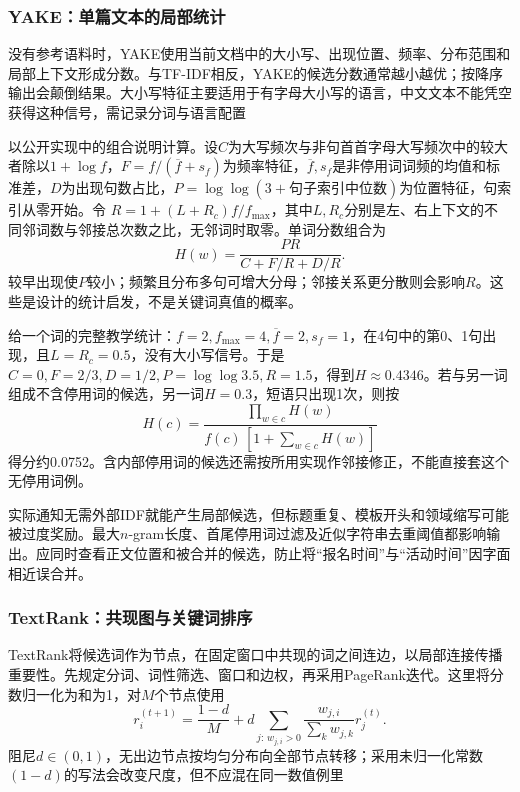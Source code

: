 \subsubsection{YAKE：单篇文本的局部统计}
\label{sec:nlp-classification-yake}

没有参考语料时，YAKE使用当前文档中的大小写、出现位置、频率、分布范围和局部上下文形成分数。与TF-IDF相反，YAKE的候选分数通常越小越优；按降序输出会颠倒结果。大小写特征主要适用于有字母大小写的语言，中文文本不能凭空获得这种信号，需记录分词与语言配置

以公开实现中的组合说明计算。设$C$为大写频次与非句首首字母大写频次中的较大者除以$1+\log f$，$F=f/(\overline f+s_f)$为频率特征，$\overline f,s_f$是非停用词词频的均值和标准差，$D$为出现句数占比，$P=\log\log(3+\text{句子索引中位数})$为位置特征，句索引从零开始。令
$R=1+(L+R_{\!c})f/f_{\max}$，其中$L,R_{\!c}$分别是左、右上下文的不同邻词数与邻接总次数之比，无邻词时取零。单词分数组合为
\[
 H(w)=\frac{P R}{C+F/R+D/R}.
\]
较早出现使$P$较小；频繁且分布多句可增大分母；邻接关系更分散则会影响$R$。这些是设计的统计启发，不是关键词真值的概率。

给一个词的完整教学统计：$f=2,f_{\max}=4,\overline f=2,s_f=1$，在4句中的第0、1句出现，且$L=R_{\!c}=0.5$，没有大小写信号。于是$C=0,F=2/3,D=1/2,P=\log\log3.5,R=1.5$，得到$H\approx0.4346$。若与另一词组成不含停用词的候选，另一词$H=0.3$，短语只出现1次，则按
\[
 H(c)=\frac{\prod_{w\in c}H(w)}
             {f(c)\,[1+\sum_{w\in c}H(w)]}
\]
得分约0.0752。含内部停用词的候选还需按所用实现作邻接修正，不能直接套这个无停用词例。

实际通知无需外部IDF就能产生局部候选，但标题重复、模板开头和领域缩写可能被过度奖励。最大$n$-gram长度、首尾停用词过滤及近似字符串去重阈值都影响输出。应同时查看正文位置和被合并的候选，防止将“报名时间”与“活动时间”因字面相近误合并。

\subsubsection{TextRank：共现图与关键词排序}
\label{sec:nlp-classification-textrank}

TextRank将候选词作为节点，在固定窗口中共现的词之间连边，以局部连接传播重要性。先规定分词、词性筛选、窗口和边权，再采用PageRank迭代。这里将分数归一化为和为1，对$M$个节点使用
\[
 r_i^{(t+1)}=\frac{1-d}{M}
 +d\sum_{j:\,w_{j,i}>0}
 \frac{w_{j,i}}{\sum_k w_{j,k}}r_j^{(t)}.
\]
阻尼$d\in(0,1)$，无出边节点按均匀分布向全部节点转移；采用未归一化常数$(1-d)$的写法会改变尺度，但不应混在同一数值例里

